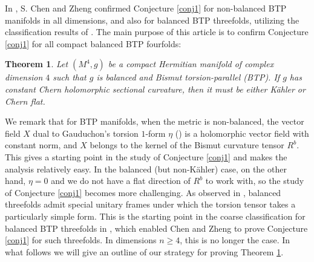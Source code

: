 \documentclass{amsart}
\newtheorem{theorem}{Theorem}%
\begin{document}
In \cite[Theorem 1.2]{ChenZ26}, S. Chen and Zheng confirmed Conjecture \ref{conj1} for non-balanced BTP manifolds in all dimensions, and also for balanced BTP threefolds, utilizing the classification results of \cite{ZhaoZ25}. The main purpose of this article is to confirm Conjecture \ref{conj1} for all compact balanced BTP fourfolds:

\begin{theorem} \label{thm1}
Let $(M^4,g)$ be a compact Hermitian manifold of complex dimension $4$ such that $g$ is balanced and Bismut torsion-parallel (BTP). If $g$ has constant Chern holomorphic sectional curvature, then it must be either K\"ahler or Chern flat.
\end{theorem}

We remark that for BTP manifolds, when the metric is non-balanced, the vector field $X$ dual to Gauduchon's torsion $1$-form $\eta$ (\cite{Gauduchon}) is a holomorphic vector field with constant norm, and $X$ belongs to the kernel of the Bismut curvature tensor $R^b$. This gives a starting point in the study of Conjecture \ref{conj1} and makes the analysis relatively easy. In the balanced (but non-K\"ahler) case, on the other hand, $\eta =0$ and we do not have a flat direction of $R^b$ to work with, so the study of Conjecture \ref{conj1} becomes more challenging. As observed in \cite{ZhouZ}, balanced threefolds admit special unitary frames under which the torsion tensor takes  a particularly simple form. This is the starting point in the coarse classification for balanced BTP threefolds in \cite{ZhaoZ25}, which enabled Chen and Zheng to prove Conjecture \ref{conj1} for such threefolds. In dimensions $n\geq 4$, this is no longer the case. In what follows we will give an outline of our strategy for proving Theorem \ref{thm1}.
\end{document}
